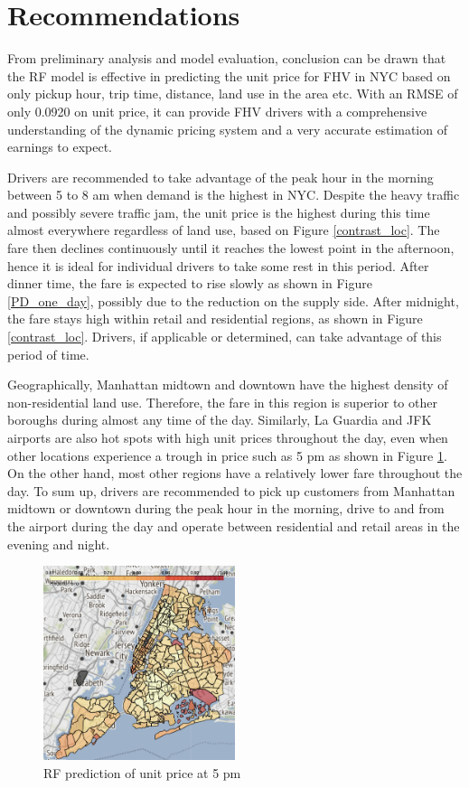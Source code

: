 \documentclass[11pt]{article}
\begin{document}
\section{Recommendations}
From preliminary analysis and model evaluation, conclusion can be drawn that the RF model is  effective in predicting the unit price for FHV in NYC based on only pickup hour, trip time, distance, land use in the area etc. With an RMSE of only 0.0920 on unit price, it can provide FHV drivers with a comprehensive understanding of the dynamic pricing system and a very accurate estimation of earnings to expect.

Drivers are recommended to take advantage of the peak hour in the morning between 5 to 8 am when demand is the highest in NYC. Despite the heavy traffic and possibly severe traffic jam, the unit price is the highest during this time almost everywhere regardless of land use, based on Figure \ref{contrast_loc}. The fare then declines continuously until it reaches the lowest point in the afternoon, hence it is ideal for individual drivers to take some rest in this period. After dinner time, the fare is expected to rise slowly as shown in Figure \ref{PD_one_day}, possibly due to the reduction on the supply side. After midnight, the fare stays high within retail and residential regions, as shown in Figure \ref{contrast_loc}. Drivers, if applicable or determined, can take advantage of this period of time. 

Geographically, Manhattan midtown and downtown have the highest density of non-residential land use. Therefore, the fare in this region is superior to other boroughs during almost any time of the day. Similarly, La Guardia and JFK airports are also hot spots with high unit prices throughout the day, even when other locations experience a trough in price such as 5 pm as shown in Figure \ref{RFpred_17}. On the other hand, most other regions have a relatively lower fare throughout the day. To sum up, drivers are recommended to pick up customers from Manhattan midtown or downtown during the peak hour in the morning, drive to and from the airport during the day and operate between residential and retail areas in the evening and night. 

\begin{figure}[h]
    \includegraphics[width=0.5\textwidth]{plots/RFpred_17.png}
    \centering
    \caption{RF prediction of unit price at 5 pm}
    \label{RFpred_17}
\end{figure}
\end{document}
